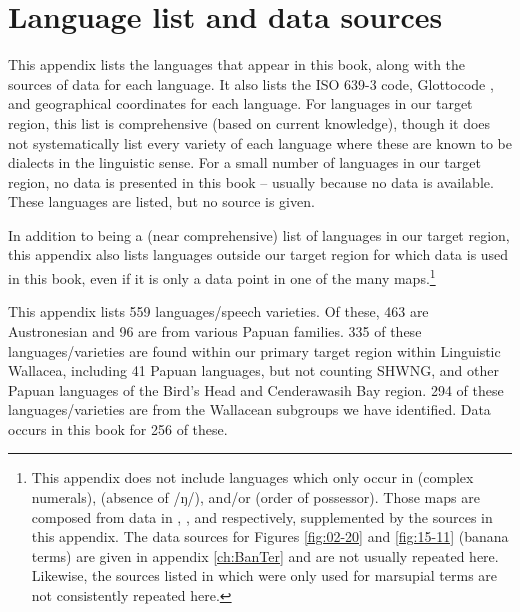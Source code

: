 \chapter{Language list and data sources}\label{ch:LanLis}
This appendix lists the languages that appear in this book,
along with the sources of data for each language.
It also lists the ISO 639-3
code, Glottocode \citep{Hammarstrom2023},
and geographical coordinates for each language.
For languages in our target region,
this list is comprehensive (based on current knowledge),
though it does not systematically list every variety of each
language where these are known to be dialects in the linguistic sense.
For a small number of languages in our target region,
no data is presented in this book -- usually because no data is available.
These languages are listed,
but no source is given.

In addition to being a (near comprehensive) list of languages
in our target region,
this appendix also lists languages outside our target region
for which data is used in this book,
even if it is only a data point in one of the many maps.\footnote{
		This appendix does not include languages which only occur in 
		(complex numerals),  (absence of /ŋ/),
		and/or  (order of possessor).
		Those maps are composed from data in \citet{SchapperHammarstrom2013},
		\citet{DonohueDawson2013}, and \citet{Dryer2013b} respectively,
		supplemented by the sources in this appendix.
		The data sources for Figures \ref{fig:02-20}
		and \ref{fig:15-11} (banana terms) are given in appendix \ref{ch:BanTer}
		and are not usually repeated here.
		Likewise, the sources listed in  which
		were only used for marsupial terms
		are not consistently repeated here.}

This appendix lists 559 languages/speech varieties.
Of these, 463 are Austronesian
and 96 are from various Papuan families.
335 of these languages/varieties are found within
our primary target
region within Linguistic Wallacea,
including 41 Papuan  languages,
but not counting SHWNG,
 and other Papuan languages of the Bird’s
Head and Cenderawasih Bay region.
294 of these languages/varieties are from the
Wallacean subgroups we have identified.
Data occurs in this book for 256 of these.

